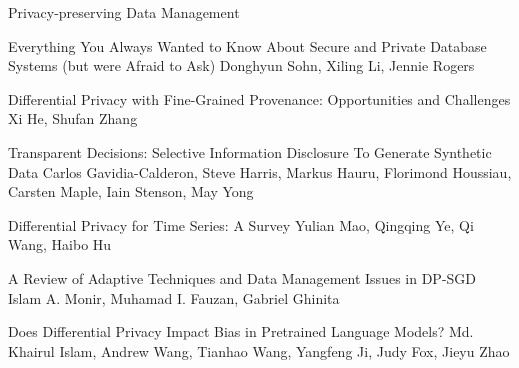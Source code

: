 \documentclass[11pt]{article}
\begin{document}
\begin{bulletin}
\begin{articlesection}{Privacy-preserving Data Management}

% 

\begin{article}
{Everything You Always Wanted to Know About Secure and Private Database Systems (but were Afraid to Ask)}
{Donghyun Sohn, Xiling Li, Jennie Rogers}

\end{article}
\begin{article}
{Differential Privacy with Fine-Grained Provenance: Opportunities
and Challenges}
{Xi He, Shufan Zhang}

\end{article}
\begin{article}
{Transparent Decisions: Selective Information Disclosure To Generate Synthetic Data}
{Carlos Gavidia-Calderon, Steve Harris, Markus Hauru, Florimond Houssiau,
Carsten Maple, Iain Stenson, May Yong}

\end{article}
\begin{article}
{Differential Privacy for Time Series: A Survey}
{Yulian Mao, Qingqing Ye, Qi Wang, Haibo Hu}

\end{article}
\begin{article}
{A Review of Adaptive Techniques and Data Management Issues in DP-SGD}
{Islam A. Monir, Muhamad I. Fauzan, Gabriel Ghinita}
 
\end{article}
\begin{article}
{Does Differential Privacy Impact Bias in Pretrained Language Models?}
{Md. Khairul Islam, Andrew Wang, Tianhao Wang, Yangfeng Ji, Judy Fox, Jieyu Zhao}
 
\end{article}
\end{articlesection}




\end{bulletin}
\end{document}
